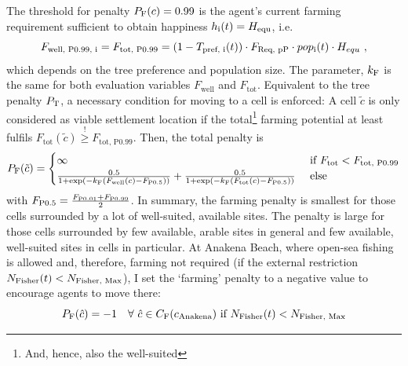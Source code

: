 The threshold for penalty $P_{\rm F}(c)=0.99$ is the agent's current farming requirement sufficient to obtain happiness $h_{\rm i}(t) = H_{\rm equ}$, i.e.\
\begin{equation} 
F_\text{well, P0.99, i} = F_\text{tot, P0.99} = (1-T_\text{pref, i}(t))\cdot F_\text{Req, pP}\cdot pop_{\rm i}(t) \cdot H_{equ} \ , 
\end{equation}
which depends on the tree preference and population size.
The parameter, $k_{\rm F}$ is the same for both evaluation variables $F_\text{well} $ and $F_\text{tot}$.
Equivalent to the tree penalty $P_{\rm T}$, a necessary condition for moving to a cell is enforced:
 A cell $\tilde{c}$ is only considered as viable settlement location if the total\footnote{And, hence, also the well-suited} farming potential at least fulfils
 $F_\text{tot}(\tilde{c})  \stackrel{!}{\geq} F_\text{tot, P0.99}$.
Then, the total penalty is 
\begin{equation}
P_{\rm F} (\tilde{c}) = 
\begin{cases} 
\infty & \text{ if } F_\text{tot} < F_\text{tot, P0.99}\\
\frac{0.5}{1+\exp\left( - k_{\rm F} (F_\text{well}(c)-F_\text{P0.5}) \right)} + \frac{0.5}{1+\exp\left( - k_{\rm F} (F_\text{tot}(c)-F_\text{P0.5}) \right)} & \text{ else}
\end{cases}
\end{equation}
with $F_\text{P0.5} = \frac{F_{\rm P0.01}+F_{\rm P0.99}}{2}$.
In summary, the farming penalty is smallest for those cells surrounded by a lot of well-suited, available sites.
The penalty is large for those cells surrounded by few available, arable sites in general and few available, well-suited sites in cells in particular.
At Anakena Beach, where open-sea fishing is allowed and, therefore, farming not required (if the external restriction $N_{\rm Fisher}(t)<N_\text{Fisher, Max}$), I set the `farming' penalty to a negative value to encourage agents to move there:
\begin{equation}
	P_{\rm F}(\hat{c}) = - 1 %
	 \quad \forall \  \hat{c} \in C_\text{F}(c_{\rm Anakena}) \text{ if }N_{\rm Fisher}(t)<N_\text{Fisher, Max}
\end{equation}


